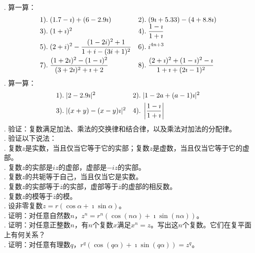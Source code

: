 \documentclass[12pt,UTF8]{ctexbook}
\begin{document}
\begin{xt}
    \mbox{} \\
    . 算一算：
    $$
    \begin{array}[]{ll}
        1). \;(1.7 - \imath) + (6 - 2.9\imath)   & 2).\; (9\imath + 5.33) - (4 + 8.8\imath) \\
        3). \;(1+\imath)^2                       & 4). \;\displaystyle \frac{1 - \imath}{1 + \imath} \\
        5). \;\displaystyle (2 + i)^2 - \frac{(1 - 2i)^2 + 1}{1 + i - (3i + 1)^2 }   & 6). \;\displaystyle i^{4n+3} \\[8pt]
        7). \;\displaystyle\frac{(1 + 2\imath)^2 - (1 - \imath)^2}{(3 + 2\imath)^2 + \imath + 2} & 8). \;\displaystyle\frac{(2 + \imath)^2 + (1 - \imath)^2 - \imath}{1 + \imath + (2\imath - 1)^2} \\
    \end{array}
    $$
    . 算一算：
    $$
    \begin{array}[]{ll}
        1). \;|2 - 2.9\imath|^2   & 2).\; |1 - 2a + (a - 1)\imath|^2 \\[4pt]
        3). \;|(x + y) - (x - y)\imath|^2   & 4).\;\displaystyle\left|\frac{1 - \imath}{1 + \imath} \right|\\
    \end{array}
    $$
    . 验证：复数满足加法、乘法的交换律和结合律，以及乘法对加法的分配律。\\
    . 验证以下说法：\\
    . 复数$z$是实数，当且仅当它等于它的实部；复数$z$是虚数，当且仅当它等于它的虚部。\\
    . 复数$z$的实部是$iz$的虚部，虚部是$-iz$的实部。\\
    . 复数$z$的共轭等于自己，当且仅当它是实数。\\
    . 复数$z$的实部等于$\overline{z}$的实部，虚部等于$\overline{z}$的虚部的相反数。\\
    . 复数$z$的模等于$\overline{z}$的模。\\
    . 设非零复数$z = r(\cos{\alpha} + \imath\sin{\alpha})$。\\
    . 证明：对任意自然数$n$，$z^n = r^n(\cos{(n\alpha)} + \imath\sin{(n\alpha)})$。 \\
    . 证明：对任意正整数$n$，有$n$个复数$x$满足$x^n = z$。写出这$n$个复数。它们在复平面上有何关系？\\
    . 证明：对任意有理数$q$，$r^q(\cos{(q\alpha)} + \imath\sin{(q\alpha)}) = z^q$。 \\

\end{xt}
\end{document}
